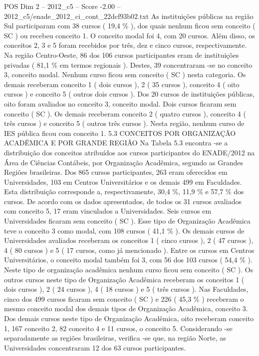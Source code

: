 \begin{textsample}{POS Dim 2 – 2012\_c5 – Score -2.00 – 2012\_c5/enade\_2012\_ci\_cont\_22dcf93b02.txt}
As instituições públicas na região Sul participaram com 38 cursos ( 19,4 \% ), dos quais nenhum ficou sem conceito ( SC ) ou recebeu conceito 1.
O conceito modal foi 4, com 20 cursos.
Além disso, os conceitos 2, 3 e 5 foram recebidos por três, dez e cinco cursos, respectivamente.
Na região Centro-Oeste, 86 dos 106 cursos participantes eram de instituições privadas ( 81,1 \% em termos regionais ).
Destes, 39 concentraram -se no conceito 3, conceito modal.
Nenhum curso ficou sem conceito ( SC ) nesta categoria.
Os demais receberam conceito 1 ( dois cursos ), 2 ( 35 cursos ), conceito 4 ( oito cursos ) e conceito 5 ( outros dois cursos ).
Dos 20 cursos de instituições públicas, oito foram avaliados no conceito 3, conceito modal.
Dois cursos ficaram sem conceito ( SC ).
Os demais receberam conceito 2 ( quatro cursos ), conceito 4 ( três cursos ) e conceito 5 ( outros três cursos ).
Nesta região, nenhum curso de IES pública ficou com conceito 1. 5.3 CONCEITOS POR ORGANIZAÇÃO ACADÊMICA E POR GRANDE REGIÃO Na Tabela 5.3 encontra -se a distribuição dos conceitos atribuídos aos cursos participantes do ENADE/2012 na Área de Ciências Contábeis, por Organização Acadêmica, segundo as Grandes Regiões brasileiras.
Dos 865 cursos participantes, 263 eram oferecidos em Universidades, 103 em Centros Universitários e os demais 499 em Faculdades.
Esta distribuição corresponde a, respectivamente, 30,4 \%, 11,9 \% e 57,7 \% dos cursos.
De acordo com os dados apresentados, de todos os 31 cursos avaliados com conceito 5, 17 eram vinculados a Universidades.
Seis cursos em Universidades ficaram sem conceito ( SC ).
Esse tipo de Organização Acadêmica teve o conceito 3 como modal, com 108 cursos ( 41,1 \% ).
Os demais cursos de Universidades avaliados receberam os conceitos 1 ( cinco cursos ), 2 ( 47 cursos ), 4 ( 80 cursos ) e 5 ( 17 cursos, como já mencionado ).
Entre os cursos em Centros Universitários, o conceito modal também foi 3, com 56 dos 103 cursos ( 54,4 \% ).
Neste tipo de organização acadêmica nenhum curso ficou sem conceito ( SC ).
Os outros cursos neste tipo de Organização Acadêmica receberam os conceitos 1 ( dois cursos ), 2 ( 24 cursos ), 4 ( 18 cursos ) e 5 ( três cursos ).
Nas Faculdades, cinco dos 499 cursos ficaram sem conceito ( SC ) e 226 ( 45,3 \% ) receberam o mesmo conceito modal dos demais tipos de Organização Acadêmica, conceito 3.
Dos demais cursos neste tipo de Organização Acadêmica, oito receberam conceito 1, 167 conceito 2, 82 conceito 4 e 11 cursos, o conceito 5.
Considerando -se separadamente as regiões brasileiras, verifica -se que, na região Norte, as Universidades concentraram 12 dos 63 cursos participantes.

\end{textsample}
